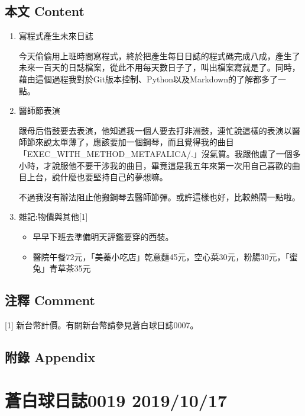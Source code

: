 \documentclass[
]{article}
\providecommand{\tightlist}{%
  \setlength{\itemsep}{0pt}\setlength{\parskip}{0pt}}
\begin{document}
\hypertarget{ux672cux6587-content-17}{%
\subsection{本文 Content}\label{ux672cux6587-content-17}}

\begin{enumerate}
\def\labelenumi{\arabic{enumi}.}
\item
  寫程式產生未來日誌

  今天偷偷用上班時間寫程式，終於把產生每日日誌的程式碼完成八成，產生了未來一百天的日誌檔案，從此不用每天數日子了，叫出檔案寫就是了。同時，藉由這個過程我對於Git版本控制、Python以及Markdown的了解都多了一點。
\item
  醫師節表演

  跟母后借鼓要去表演，他知道我一個人要去打非洲鼓，連忙說這樣的表演以醫師節來說太單薄了，應該要加一個鋼琴，而且覺得我的曲目「EXEC\_WITH\_METHOD\_METAFALICA/.」沒氣質。我跟他盧了一個多小時，才說服他不要干涉我的曲目，畢竟這是我五年來第一次用自己喜歡的曲目上台，說什麼也要堅持自己的夢想嘛。

  不過我沒有辦法阻止他搬鋼琴去醫師節彈。或許這樣也好，比較熱鬧一點啦。
\item
  雜記:物價與其他{[}1{]}

  \begin{itemize}
  \tightlist
  \item
    早早下班去準備明天評鑑要穿的西裝。
  \item
    醫院午餐72元，「美蓁小吃店」乾意麵45元，空心菜30元，粉腸30元，「蜜兔」青草茶35元
  \end{itemize}
\end{enumerate}

\hypertarget{ux6ce8ux91cb-comment-11}{%
\subsection{注釋 Comment}\label{ux6ce8ux91cb-comment-11}}

{[}1{]} 新台幣計價。有關新台幣請參見蒼白球日誌0007。

\hypertarget{ux9644ux9304-appendix-10}{%
\subsection{附錄 Appendix}\label{ux9644ux9304-appendix-10}}

\hypertarget{ux84bcux767dux7403ux65e5ux8a8c0019-20191017}{%
\section{蒼白球日誌0019
2019/10/17}\label{ux84bcux767dux7403ux65e5ux8a8c0019-20191017}}
\end{document}
